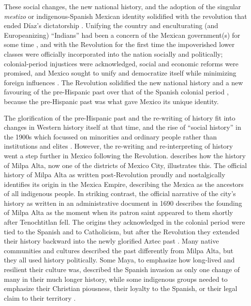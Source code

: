 
These social changes, the new national history, and the adoption of the singular \textit{mestizo} or indigenous-Spanish Mexican identity solidified with the revolution that ended Díaz’s dictatorship \parencite[66-67]{Swarthout2004}. 
Unifying the country and enculturating (and Europeanizing) “Indians” had been a concern of the Mexican government(s) for some time \parencites[336]{Caballero2008}[75]{Restall2003}, 
and with the Revolution for the first time the impoverished lower classes were officially incorporated into the nation socially and politically; colonial-period injustices were acknowledged, social and economic reforms were promised, and Mexico sought to unify and democratize itself while minimizing foreign influences \parencites[66-67]{Swarthout2004}[276]{Trigger2006}. 
The Revolution solidified the new national history and a new favouring of the pre-Hispanic past over that of the Spanish colonial period \parencites[330]{Caballero2008}[276]{Trigger2006}, because the pre-Hispanic past was what gave Mexico its unique identity.

The glorification of the pre-Hispanic past and the re-writing of history fit into changes in Western history itself at that time, and the rise of “social history” in the 1900s which focussed on minorities and ordinary people rather than institutions and elites \parencite[14]{Howell2001}. 
However, the re-writing and re-interpreting of history went a step further in Mexico following the Revolution. \textcite{Caballero2008} describes how the history of Milpa Alta, now one of the districts of Mexico City, illustrates this. The official history of Milpa Alta as written post-Revolution proudly and nostalgically identifies its origin in the Mexica Empire, describing the Mexica as the ancestors of all indigenous people. In striking contrast, the official narrative of the city’s history as written in an administrative document in 1690 describes the founding of Milpa Alta as the moment when its patron saint appeared to them shortly after Tenochtitlan fell. The origins they acknowledged in the colonial period were tied to the Spanish and to Catholicism, but after the Revolution they extended their history backward into the newly glorified Aztec past \parencite[331-333]{Caballero2008}. 
Many native communities and cultures described the past differently from Milpa Alta, but they all used history politically. Some Maya, to emphasize how long-lived and resilient their culture was, described the Spanish invasion as only one change of many in their much longer history, while some indigenous groups needed to emphasize their Christian piousness, their loyalty to the Spanish, or their legal claim to their territory \parencite[122]{Restall2003}.

